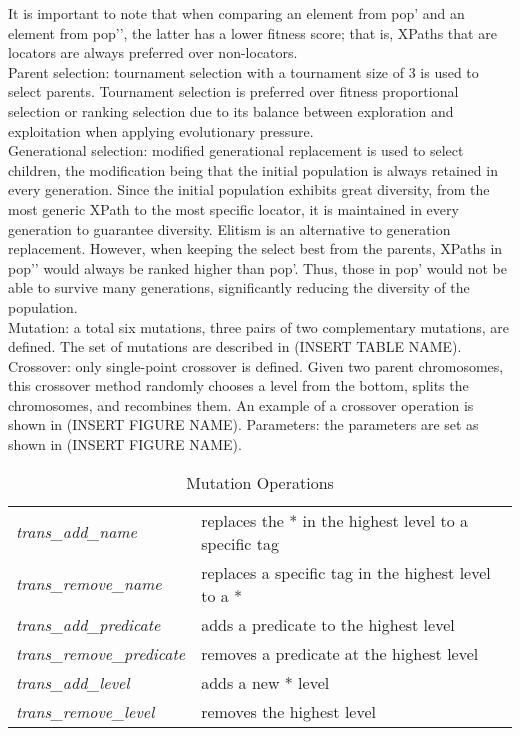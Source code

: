 \documentclass[format=acmlarge, nonacm=true]{acmart}
\begin{document}
It is important to note that when comparing an element from pop’ and an element from pop’’, the latter has a lower fitness score; that is, XPaths that are locators are always preferred over non-locators.\\
Parent selection: tournament selection with a tournament size of 3 is used to select parents. Tournament selection is preferred over fitness proportional selection or ranking selection due to its balance between exploration and exploitation when applying evolutionary pressure.\\
Generational selection: modified generational replacement is used to select children, the modification being that the initial population is always retained in every generation. Since the initial population exhibits great diversity, from the most generic XPath to the most specific locator, it is maintained in every generation to guarantee diversity. Elitism is an alternative to generation replacement. However, when keeping the select best from the parents, XPaths in pop’’ would always be ranked higher than pop’. Thus, those in pop’ would not be able to survive many generations, significantly reducing the diversity of the population.\\
Mutation: a total six mutations, three pairs of two complementary mutations, are defined. The set of mutations are described in (INSERT TABLE NAME).\\
Crossover: only single-point crossover is defined. Given two parent chromosomes, this crossover method randomly chooses a level from the bottom, splits the chromosomes, and recombines them. An example of a crossover operation is shown in (INSERT FIGURE NAME).
Parameters: the parameters are set as shown in (INSERT FIGURE NAME).\\
\begin{table}
	\caption{Mutation Operations}
	\label{tab:conf}
	\begin{minipage}{\columnwidth}
		\begin{center}
			\begin{tabular}{ll}
				\toprule
				\emph{trans\_add\_name} & replaces the * in the highest level to a specific tag \\
				\emph{trans\_remove\_name} & replaces a specific tag in the highest level to a *\\
				\midrule
				\emph{trans\_add\_predicate} & adds a predicate to the highest level \\
				\emph{trans\_remove\_predicate} & removes a predicate at the highest level \\
				\midrule
				\emph{trans\_add\_level} & adds a new * level\\
				\emph{trans\_remove\_level} & removes the highest level\\
				\bottomrule
			\end{tabular}
		\end{center}
	\end{minipage}
\end{table}
\end{document}
